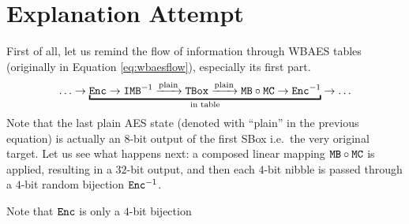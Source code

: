 \section{Explanation Attempt}
\label{sec:attempt}

First of all, let us remind the flow of information through WBAES tables (originally in Equation \ref{eq:wbaesflow}), especially its first part.
\begin{equation}
\label{eq:wbaesfirst}
	\ldots \rarr \underbracket{\Enc \rarr \IMB^{-1} \xrightarrow{\textnormal{plain}} \TBox \xrightarrow{\textnormal{plain}} \MB \circ \MC \rarr \Enc^{-1}}_{\textnormal{in table}} \rarr \ldots
\end{equation}
Note that the last plain AES state (denoted with ``plain'' in the previous equation) is actually an $8$-bit output of the first SBox i.e.\ the very original target. Let us see what happens next: a composed linear mapping $\texttt{MB}\circ\texttt{MC}$ is applied, resulting in a $32$-bit output, and then each $4$-bit nibble is passed through a $4$-bit random bijection $\texttt{Enc}^{-1}$. 

Note that $\texttt{Enc}$ is only a $4$-bit bijection 


